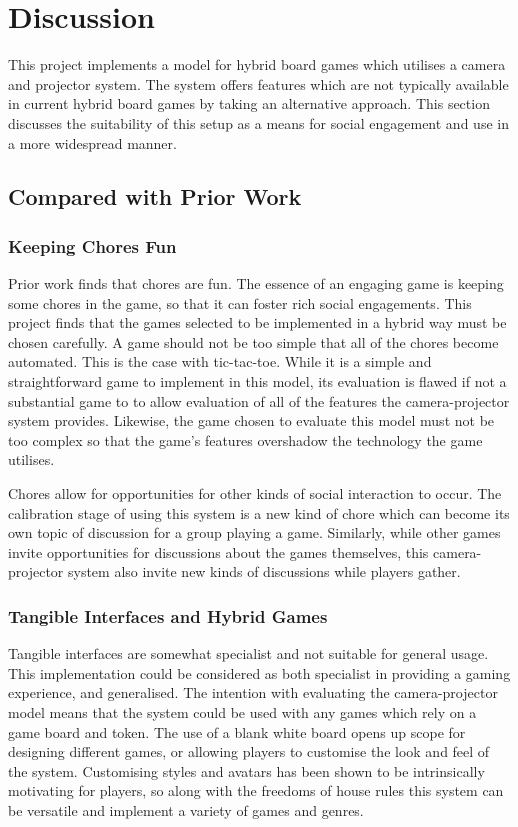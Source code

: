 \documentclass[12pt]{article}
\begin{document}
\section{Discussion}
This project implements a model for hybrid board games which utilises a camera and projector system. 
The system offers features which are not typically available in current hybrid board games by taking an alternative approach.
This section discusses the suitability of this setup as a means for social engagement and use in a more widespread manner. 

\subsection{Compared with Prior Work}
\subsubsection{Keeping Chores Fun}
Prior work finds that chores are fun. 
The essence of an engaging game is keeping some chores in the game, so that it can foster rich social engagements. 
This project finds that the games selected to be implemented in a hybrid way must be chosen carefully. 
A game should not be too simple that all of the chores become automated. 
This is the case with tic-tac-toe. While it is a simple and straightforward game to implement in this model, its evaluation is flawed if not a substantial game to to allow evaluation of all of the features the camera-projector system provides. 
Likewise, the game chosen to evaluate this model must not be too complex so that the game's features overshadow the technology the game utilises. 

Chores allow for opportunities for other kinds of social interaction to occur. 
The calibration stage of using this system is a new kind of chore which can become its own topic of discussion for a group playing a game. 
Similarly, while other games invite opportunities for discussions about the games themselves, this camera-projector system also invite new kinds of discussions while players gather. 

\subsubsection{Tangible Interfaces and Hybrid Games}
Tangible interfaces are somewhat specialist and not suitable for general usage. 
This implementation could be considered as both specialist in providing a gaming experience, and generalised. 
The intention with evaluating the camera-projector model means that the system could be used with any games which rely on a game board and token. 
The use of a blank white board opens up scope for designing different games, or allowing players to customise the look and feel of the system. 
Customising styles and avatars has been shown to be intrinsically motivating for players, so along with the freedoms of house rules this system can be versatile and implement a variety of games and genres. 
\end{document}
